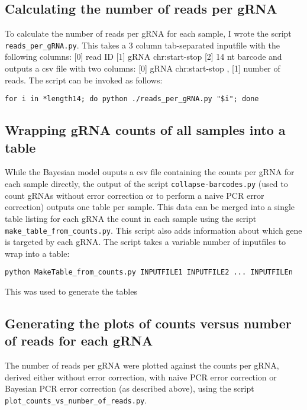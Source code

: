 \subsection{Calculating the number of reads per gRNA}

To calculate the number of reads per gRNA for each sample, I wrote the script \verb|reads_per_gRNA.py|. This takes a 3 column tab-separated inputfile with the following columns: [0] read ID [1] gRNA chr:start-stop [2] 14 nt barcode and outputs a csv file with two columns: [0] gRNA chr:start-stop , [1] number of reads. The script can be invoked as follows:

\begin{lstlisting}
for i in *length14; do python ./reads_per_gRNA.py "$i"; done
\end{lstlisting}

\subsection{Wrapping gRNA counts of all samples into a table}

While the Bayesian model ouputs a csv file containing the counts per gRNA for each sample directly, the output of the script \verb|collapse-barcodes.py| (used to count gRNAs without error correction or to perform a naive PCR error correction) outputs one table per sample. This data can be merged into a single table listing for each gRNA the count in each sample using the script \verb|make_table_from_counts.py|. This script also adds information about which gene is targeted by each gRNA. The script takes a variable number of inputfiles to wrap into a table:

\begin{lstlisting}
python MakeTable_from_counts.py INPUTFILE1 INPUTFILE2 ... INPUTFILEn
\end{lstlisting}

This was used to generate the tables 

\subsection{Generating the plots of counts versus number of reads for each gRNA}

The number of reads per gRNA were plotted against the counts per gRNA, derived either without error correction, with naive PCR error correction or Bayesian PCR error correction (as described above), using the script \verb|plot_counts_vs_number_of_reads.py|.



